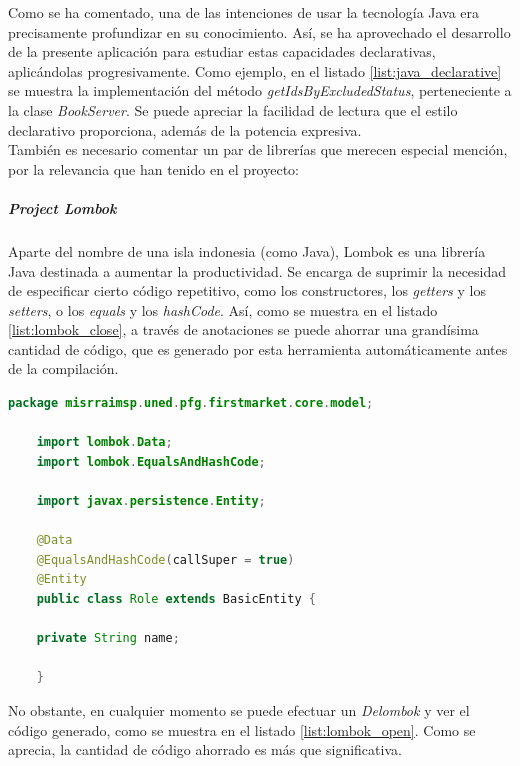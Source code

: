 \documentclass[a4paper]{article}
\begin{document}
    Como se ha comentado, una de las intenciones de usar la tecnología Java era precisamente profundizar en su conocimiento. Así, se ha aprovechado el desarrollo de la presente aplicación para estudiar estas capacidades declarativas, aplicándolas progresivamente. Como ejemplo, en el listado \ref{list:java_declarative} se muestra la implementación del método \emph{getIdsByExcludedStatus}, perteneciente a la clase \emph{BookServer}. Se puede apreciar la facilidad de lectura que el estilo declarativo proporciona, además de la potencia expresiva. 
    \\
    
    También es necesario comentar un par de librerías que merecen especial mención, por la relevancia que han tenido en el proyecto:
    
    \subparagraph{Project Lombok}
    Aparte del nombre de una isla indonesia (como Java), Lombok es una librería Java destinada a aumentar la productividad. Se encarga de suprimir la necesidad de especificar cierto código repetitivo, como los constructores, los \emph{getters} y los \emph{setters}, o los \emph{equals} y los \emph{hashCode}. Así, como se muestra en el listado \ref{list:lombok_close}, a través de anotaciones se puede ahorrar una grandísima cantidad de código, que es generado por esta herramienta automáticamente antes de la compilación.
    \\
    
    \begin{lstlisting}[language=Java,caption=Clase \emph{Role} usando las anotaciones Lombok,label=list:lombok_close]
    package misrraimsp.uned.pfg.firstmarket.core.model;
    
    import lombok.Data;
    import lombok.EqualsAndHashCode;
    
    import javax.persistence.Entity;
    
    @Data
    @EqualsAndHashCode(callSuper = true)
    @Entity
    public class Role extends BasicEntity {
    
    private String name;
    
    }
    \end{lstlisting}
    
    No obstante, en cualquier momento se puede efectuar un \emph{Delombok} y ver el código generado, como se muestra en el listado \ref{list:lombok_open}. Como se aprecia, la cantidad de código ahorrado es más que significativa.
    \\
    
\end{document}
